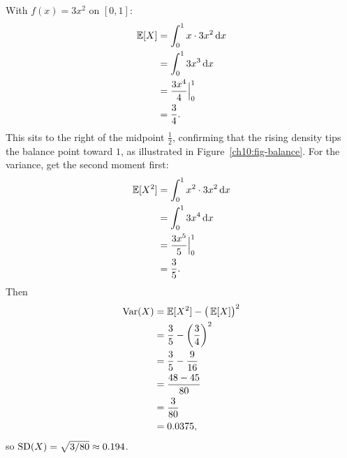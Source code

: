 \begin{example}[Mean and variance of $f=3x^2$]
\label{ch10:ex-EV}
With $f(x)=3x^2$ on $[0,1]$:
\begin{align*}
  \operatorname{\mathbb{E}}[X] &= \int_0^1 x\cdot 3x^2 \,\mathrm{d} x \\
        &= \int_0^1 3x^3 \,\mathrm{d} x \\
        &= \frac{3x^4}{4}\Big|_0^1 \\
        &= \frac34 .
\end{align*}
This sits to the right of the midpoint $\tfrac12$, confirming that the rising
density tips the balance point toward $1$, as illustrated in Figure~\ref{ch10:fig-balance}.
For the variance, get the second moment first:
\begin{align*}
  \operatorname{\mathbb{E}}[X^2] &= \int_0^1 x^2 \cdot 3x^2 \,\mathrm{d} x \\
          &= \int_0^1 3x^4 \,\mathrm{d} x \\
          &= \frac{3x^5}{5}\Big|_0^1 \\
          &= \frac35 .
\end{align*}
Then
\begin{align*}
  \operatorname{Var}(X) &= \operatorname{\mathbb{E}}[X^2] - \big(\operatorname{\mathbb{E}}[X]\big)^2 \\
          &= \frac35 - \left(\frac34\right)^2 \\
          &= \frac35 - \frac{9}{16} \\
          &= \frac{48 - 45}{80} \\
          &= \frac{3}{80} \\
          &= 0.0375,
\end{align*}
so $\operatorname{SD}(X) = \sqrt{3/80} \approx 0.194$.
\end{example}

